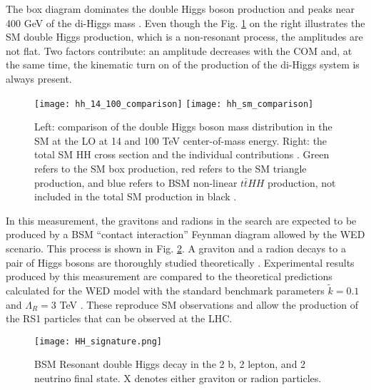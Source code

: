 The box diagram dominates the double Higgs boson production and peaks near 400 GeV of the di-Higgs mass \cite{Chen:2014xra}. Even though the Fig. \ref{hh_comparison} on the right illustrates the SM double Higgs production, which is a non-resonant process, the amplitudes are not flat. Two factors contribute: an amplitude decreases with the COM and, at the same time, the kinematic turn on of the production of the di-Higgs system is always present. 



\begin{figure}[H]
  \centering 
    \texttt{[image: hh\_14\_100\_comparison]}
    \texttt{[image: hh\_sm\_comparison]}
    \caption[Double Higgs mass distribution and the total cross-section]{Left: comparison of the double Higgs boson mass distribution in the SM at the LO at 14 and 100 TeV center-of-mass energy. Right: the total SM HH cross section and the individual contributions \cite{Contino:2012xk}. Green refers to the SM box production, red refers to the SM triangle production, and blue refers to BSM non-linear $t\bar{t}HH$ production, not included in the total SM production in black \cite{Chen:2014xra}. }
    \label{hh_comparison}
\end{figure}




In this measurement, the gravitons and radions in the search are expected to be produced by a BSM ``contact interaction'' Feynman diagram allowed by the WED scenario. This process is shown in Fig. \ref{HH_signature}.  A graviton and a radion decays to a pair of Higgs bosons are thoroughly studied theoretically \cite{Chen:2014xra, HHXsec, Contino:2012xk}. Experimental results produced by this measurement are compared to the theoretical predictions calculated for the WED model with the standard benchmark parameters $\tilde{k}=0.1$ and $\Lambda_R = 3 $ TeV \cite{Wertz:2632195, Cadamuro:2292733}. These reproduce SM observations and allow the production of the RS1 particles that can be observed at the LHC. 





\begin{figure}[H]
  \centering
    \texttt{[image: HH\_signature.png]}
    \caption{BSM Resonant double Higgs decay in the 2 b, 2 lepton, and 2 neutrino final state. X denotes either graviton or radion particles. }
    \label{HH_signature}
\end{figure}




